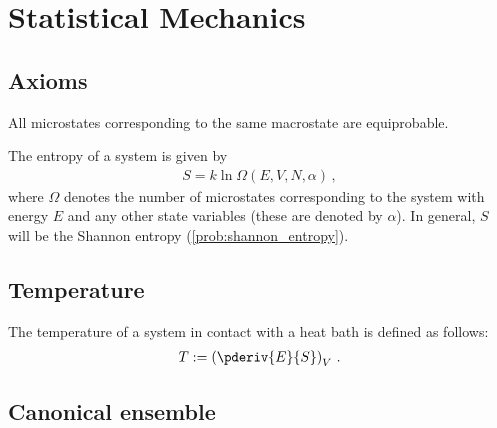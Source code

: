 \chapter{Statistical Mechanics}

    \minitoc

\section{Axioms}

    \begin{axiom}
        All microstates corresponding to the same macrostate are equiprobable.
    \end{axiom}

    \begin{axiom}\label{statmech:boltzmann_formula}
        The entropy of a system is given by
        \begin{gather}
            S = k\ln\Omega(E,V,N,\alpha)\,,
        \end{gather}
        where $\Omega$ denotes the number of microstates corresponding to the system with energy $E$ and any other state variables (these are denoted by $\alpha$). In general, $S$ will be the Shannon entropy (\cref{prob:shannon_entropy}).
    \end{axiom}

\section{Temperature}

    \begin{definition}\label{statmech:temperature}
        The temperature of a system in contact with a heat bath is defined as follows:
        \begin{gather}
            T := \left(\pderiv{E}{S}\right)_V\,.
        \end{gather}
    \end{definition}

\section{Canonical ensemble}


